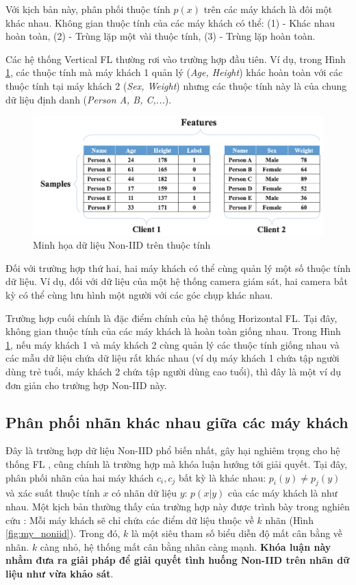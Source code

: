 Với kịch bản này, phân phối thuộc tính $p(x)$ trên các máy khách là đôi một khác nhau. Không gian thuộc tính của các máy khách có thể: (1) - Khác nhau hoàn toàn, (2) - Trùng lặp một vài thuộc tính, (3) - Trùng lặp hoàn toàn.

Các hệ thống Vertical FL thường rơi vào trường hợp đầu tiên. Ví dụ, trong Hình \ref{fig:vertical_fl}, các thuộc tính mà máy khách 1 quản lý (\textit{Age, Height}) khác hoàn toàn với các thuộc tính tại máy khách 2 (\textit{Sex, Weight}) nhưng các thuộc tính này là của chung dữ liệu định danh (\textit{Person A, B, C,...}).

\begin{figure}[H]
    \centering
    \includegraphics[scale=0.6]{../images/vertical_fl.png}
    \caption{Minh họa dữ liệu Non-IID trên thuộc tính \cite{zhu2021federated}}
    \label{fig:vertical_fl}
\end{figure}

Đối với trường hợp thứ hai, hai máy khách có thể cùng quản lý một số thuộc tính dữ liệu. Ví dụ, đối với dữ liệu của một hệ thống camera giám sát, hai camera bất kỳ có thể cùng lưu hình một người với các góc chụp khác nhau.

Trường hợp cuối chính là đặc điểm chính của hệ thống Horizontal FL. Tại đây, không gian thuộc tính của các máy khách là hoàn toàn giống nhau. Trong Hình \ref{fig:vertical_fl}, nếu máy khách 1 và máy khách 2 cùng quản lý các thuộc tính giống nhau và các mẫu dữ liệu chứa dữ liệu rất khác nhau (ví dụ máy khách 1 chứa tập người dùng trẻ tuổi, máy khách 2 chứa tập người dùng cao tuổi), thì đây là một ví dụ đơn giản cho trường hợp Non-IID này.

\subsection{Phân phối nhãn khác nhau giữa các máy khách}

Đây là trường hợp dữ liệu Non-IID phổ biến nhất, gây hại nghiêm trọng cho hệ thống FL \cite{zhu2021federated}, cũng chính là trường hợp mà khóa luận hướng tới giải quyết. Tại đây, phân phối nhãn của hai máy khách $c_i, c_j$ bất kỳ là khác nhau: $p_i(y) \ne p_j(y)$ và xác suất thuộc tính $x$ có nhãn dữ liệu $y$: $p(x|y)$ của các máy khách là như nhau. Một kịch bản thường thấy của trường hợp này được trình bày trong nghiên cứu \cite{mcmahan2017communication}: Mỗi máy khách sẽ chỉ chứa các điểm dữ liệu thuộc về $k$ nhãn (Hình \ref{fig:my_noniid}). Trong đó, $k$ là một siêu tham số biểu diễn độ mất cân bằng về nhãn. $k$ càng nhỏ, hệ thống mất cân bằng nhãn càng mạnh. \textbf{Khóa luận này nhằm đưa ra giải pháp để giải quyết tình huống Non-IID trên nhãn dữ liệu như vừa khảo sát}.

